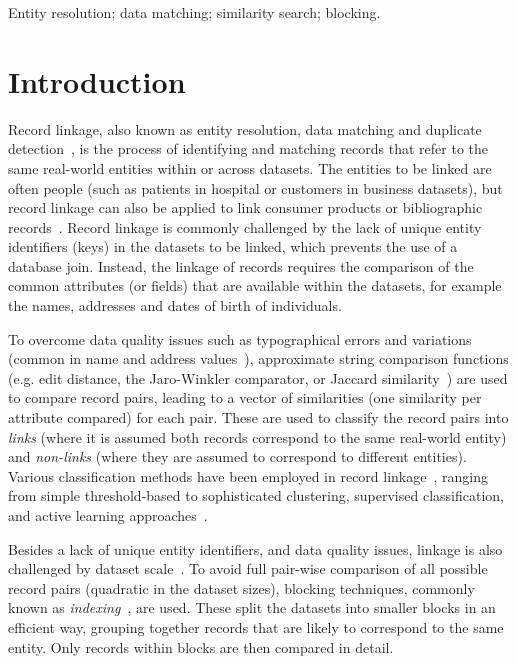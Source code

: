 \documentclass{llncs}
\begin{document}
\keywords Entity resolution; data matching; similarity search;
         blocking.


\section{Introduction}
\label{sec-intro}

Record linkage, also known as entity resolution, data matching and
duplicate detection~\cite{Chr12}, is the process of identifying and
matching records that refer to the same real-world entities within or
across datasets. The entities to be linked are often people (such as
patients in hospital or customers in business datasets), but record
linkage can also be applied to link consumer products or bibliographic
records~\cite{Chr12}. Record linkage is commonly challenged by the lack
of unique entity identifiers (keys) in the datasets to be linked, which
prevents the use of a database join. Instead, the linkage of records
requires the comparison of the common attributes (or fields) that are
available within the datasets, for example the names, addresses and
dates of birth of individuals.

To overcome data quality issues such as typographical errors and
variations (common in name and address values~\cite{Chr12}), approximate
string comparison functions (e.g. edit distance, the Jaro-Winkler
comparator, or Jaccard similarity~\cite{Chr12}) are used to compare
record pairs, leading to a vector of similarities (one similarity per
attribute compared) for each pair. These are used to classify the record
pairs into \emph{links} (where it is assumed both records correspond to
the same real-world entity) and \emph{non-links} (where they are assumed
to correspond to different entities). Various classification methods
have been employed in record linkage~\cite{Chr12,Don15}, ranging from
simple threshold-based to sophisticated clustering, supervised
classification, and active learning approaches~\cite{Wan15}.

Besides a lack of unique entity identifiers, and data quality issues,
linkage is also challenged by dataset scale~\cite{Don15}. To avoid full
pair-wise comparison of all possible record pairs (quadratic in the
dataset sizes), blocking techniques, commonly known as
\emph{indexing}~\cite{Chr12b}, are used. These split the datasets into
smaller blocks in an efficient way, grouping together records that are
likely to correspond to the same entity. Only records within blocks are
then compared in detail.
\end{document}
